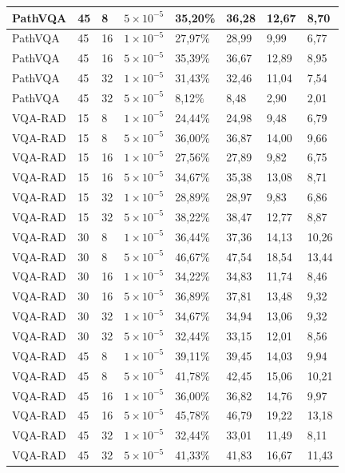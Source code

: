 \begin{longtable}[c]{|l|l|l|l|l|l|l|l|}
  PathVQA & 45 & 8  & $5 \times 10^{-5}$ & 35,20\% & 36,28 & 12,67 & 8,70  \\ \hline
  PathVQA & 45 & 16 & $1 \times 10^{-5}$ & 27,97\% & 28,99 & 9,99  & 6,77  \\ \hline
  PathVQA & 45 & 16 & $5 \times 10^{-5}$ & 35,39\% & 36,67 & 12,89 & 8,95  \\ \hline
  PathVQA & 45 & 32 & $1 \times 10^{-5}$ & 31,43\% & 32,46 & 11,04 & 7,54  \\ \hline
  PathVQA & 45 & 32 & $5 \times 10^{-5}$ & 8,12\%  & 8,48  & 2,90  & 2,01  \\ \hline
  VQA-RAD & 15 & 8  & $1 \times 10^{-5}$ & 24,44\% & 24,98 & 9,48  & 6,79  \\ \hline
  VQA-RAD & 15 & 8  & $5 \times 10^{-5}$ & 36,00\% & 36,87 & 14,00 & 9,66  \\ \hline
  VQA-RAD & 15 & 16 & $1 \times 10^{-5}$ & 27,56\% & 27,89 & 9,82  & 6,75  \\ \hline
  VQA-RAD & 15 & 16 & $5 \times 10^{-5}$ & 34,67\% & 35,38 & 13,08 & 8,71  \\ \hline
  VQA-RAD & 15 & 32 & $1 \times 10^{-5}$ & 28,89\% & 28,97 & 9,83  & 6,86  \\ \hline
  VQA-RAD & 15 & 32 & $5 \times 10^{-5}$ & 38,22\% & 38,47 & 12,77 & 8,87  \\ \hline
  VQA-RAD & 30 & 8  & $1 \times 10^{-5}$ & 36,44\% & 37,36 & 14,13 & 10,26 \\ \hline
  VQA-RAD & 30 & 8  & $5 \times 10^{-5}$ & 46,67\% & 47,54 & 18,54 & 13,44 \\ \hline
  VQA-RAD & 30 & 16 & $1 \times 10^{-5}$ & 34,22\% & 34,83 & 11,74 & 8,46  \\ \hline
  VQA-RAD & 30 & 16 & $5 \times 10^{-5}$ & 36,89\% & 37,81 & 13,48 & 9,32  \\ \hline
  VQA-RAD & 30 & 32 & $1 \times 10^{-5}$ & 34,67\% & 34,94 & 13,06 & 9,32  \\ \hline
  VQA-RAD & 30 & 32 & $5 \times 10^{-5}$ & 32,44\% & 33,15 & 12,01 & 8,56  \\ \hline
  VQA-RAD & 45 & 8  & $1 \times 10^{-5}$ & 39,11\% & 39,45 & 14,03 & 9,94  \\ \hline
  VQA-RAD & 45 & 8  & $5 \times 10^{-5}$ & 41,78\% & 42,45 & 15,06 & 10,21 \\ \hline
  VQA-RAD & 45 & 16 & $1 \times 10^{-5}$ & 36,00\% & 36,82 & 14,76 & 9,97  \\ \hline
  VQA-RAD & 45 & 16 & $5 \times 10^{-5}$ & 45,78\% & 46,79 & 19,22 & 13,18 \\ \hline
  VQA-RAD & 45 & 32 & $1 \times 10^{-5}$ & 32,44\% & 33,01 & 11,49 & 8,11  \\ \hline
  VQA-RAD & 45 & 32 & $5 \times 10^{-5}$ & 41,33\% & 41,83 & 16,67 & 11,43 \\ \hline
  \end{longtable}

